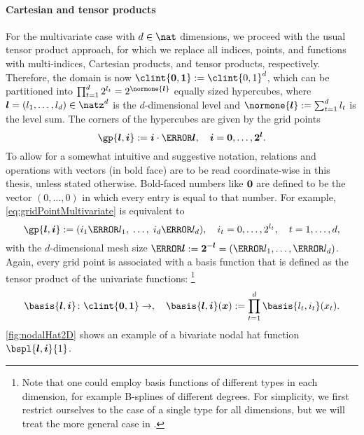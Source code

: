 \paragraph{Cartesian and tensor products}

For the multivariate case with $d \in \nat$ dimensions,
we proceed with the usual tensor product approach,
for which we replace all indices, points, and functions with
multi-indices, Cartesian products, and tensor products, respectively.
Therefore, the domain is now $\clint{\*0, \*1} := \clint{0, 1}^d$,
which can be partitioned into
$\prod_{t=1}^d 2^{l_t} = 2^{\normone{\vec{l}}}$ equally sized hypercubes,
where $\*l = (l_1, \dotsc, l_d) \in \natz^d$ is the $d$-dimensional level
and $\normone{\vec{l}} := \sum_{t=1}^d l_t$ is the level sum.
The corners of the hypercubes are given by the grid points
\begin{equation}
  \label{eq:gridPointMultivariate}
  \gp{\*l,\*i} := \*i \cdot \ms{\*l},\quad
  \*i = \*0, \dotsc, \*2^{\*l}.
\end{equation}
To allow for a somewhat intuitive and suggestive notation,
relations and operations with vectors (in bold face)
are to be read coordinate-wise in this thesis, unless stated otherwise.
Bold-faced numbers like ${\boldsymbol{0}}$ are defined to be the vector $(0, \dotsc, 0)$
in which every entry is equal to that number.
For example, \eqref{eq:gridPointMultivariate} is equivalent to
\begin{equation}
  \gp{\*l,\*i}
  := (i_1 \ms{l_1},\; \dotsc,\; i_d \ms{l_d}),\quad
  i_t = 0, \dotsc, 2^{l_t},\quad
  t = 1, \dotsc, d,
\end{equation}
with the $d$-dimensional mesh size
$\ms{\*l} := \*2^{-\*l} = (\ms{l_1}, \dotsc, \ms{l_d})$.
Again, every grid point is associated with a basis function that is defined
as the tensor product of the univariate functions:%
\footnote{%
  Note that one could employ basis functions of different types in
  each dimension, for example B-splines of different degrees.
  For simplicity, we first restrict ourselves to the case of a single type
  for all dimensions, but we will treat the more general case in
  .%
}
\begin{equation}
  \basis{\*l,\*i}\colon \clint{\*0, \*1} \to \real,\quad
  \basis{\*l,\*i}(\*x)
  := \prod_{t=1}^d \basis{l_t,i_t}(x_t).
\end{equation}
\cref{fig:nodalHat2D} shows an example of a bivariate nodal hat function
$\bspl{\*l,\*i}{1}$.


